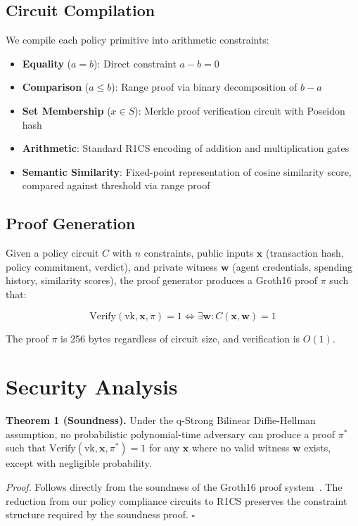 \documentclass[conference]{IEEEtran}
\begin{document}
\subsection{Circuit Compilation}

We compile each policy primitive into arithmetic constraints:

\begin{itemize}
    \item \textbf{Equality} ($a = b$): Direct constraint $a - b = 0$
    \item \textbf{Comparison} ($a \leq b$): Range proof via binary decomposition of $b - a$
    \item \textbf{Set Membership} ($x \in S$): Merkle proof verification circuit with Poseidon hash
    \item \textbf{Arithmetic}: Standard R1CS encoding of addition and multiplication gates
    \item \textbf{Semantic Similarity}: Fixed-point representation of cosine similarity score, compared against threshold via range proof
\end{itemize}

\subsection{Proof Generation}

Given a policy circuit $C$ with $n$ constraints, public inputs $\mathbf{x}$ (transaction hash, policy commitment, verdict), and private witness $\mathbf{w}$ (agent credentials, spending history, similarity scores), the proof generator produces a Groth16 proof $\pi$ such that:

$$\text{Verify}(\text{vk}, \mathbf{x}, \pi) = 1 \iff \exists \mathbf{w}: C(\mathbf{x}, \mathbf{w}) = 1$$

The proof $\pi$ is 256 bytes regardless of circuit size, and verification is $O(1)$.

\section{Security Analysis}

\textbf{Theorem 1 (Soundness).} Under the q-Strong Bilinear Diffie-Hellman assumption, no probabilistic polynomial-time adversary can produce a proof $\pi^*$ such that $\text{Verify}(\text{vk}, \mathbf{x}, \pi^*) = 1$ for any $\mathbf{x}$ where no valid witness $\mathbf{w}$ exists, except with negligible probability.

\textit{Proof.} Follows directly from the soundness of the Groth16 proof system~\cite{groth16}. The reduction from our policy compliance circuits to R1CS preserves the constraint structure required by the soundness proof. \hfill $\square$
\end{document}
